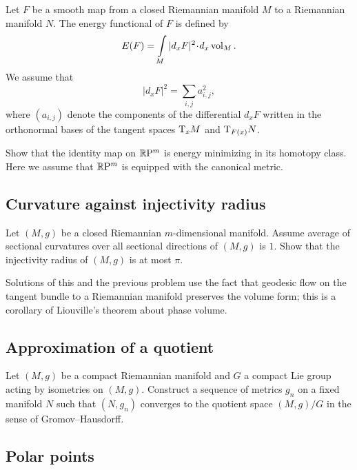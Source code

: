 Let $F$ be a smooth map from a closed Riemannian manifold $M$ to a Riemannian manifold $N$.
The energy functional of $F$ is defined by
\[E(F)=\int\limits_M |d_xF|^2\cdot d_x\vol_M.\]
We assume that  
\[|d_xF|^2=\sum_{i,j}a_{i,j}^2,\]
where $(a_{i,j})$ denote the components 
of the differential $d_xF$ 
written in the orthonormal bases of the tangent spaces $\mathrm{T}_xM$ and $\mathrm{T}_{F(x)}N$.

\begin{pr}
Show that the identity map on $\mathbb{R}\mathrm{P}^m$ is 
energy
minimizing in its homotopy class.
Here we assume that $\mathbb{R}\mathrm{P}^m$ is equipped with the canonical metric.
\end{pr}


\subsection*{Curvature against injectivity radius\thm}
\label{scalar-curv}

\begin{pr} 
Let $(M,g)$ be a closed 
Riemannian $m$-dimensional manifold.
Assume average of sectional curvatures over all sectional directions of $(M,g)$ is $1$. 
Show that the injectivity radius of $(M,g)$ is at most $\pi$.
\end{pr}

Solutions of this and the previous problem use the fact that geodesic flow on the tangent bundle to a Riemannian manifold preserves the volume form; this is a corollary of Liouville's theorem about phase volume.

\subsection*{Approximation of a quotient}

\begin{pr}
Let $(M,g)$ be a compact Riemannian manifold 
and $G$ a compact Lie group acting by isometries on $(M,g)$.
Construct a sequence of metrics $g_n$ on a fixed manifold $N$ such that $(N,g_n)$ converges to the quotient space $(M,g)/G$ in the sense of Gromov--Hausdorff.
\end{pr}


\subsection*{Polar points\many}
\label{milka-polar} 

